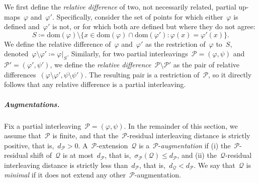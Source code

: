 \documentclass[a4paper,UKenglish, autoref, thm-restate, cleveref]{lipics-v2021}
\newcommand{\dom}{\mathrm{dom}}
\newcommand{\shift}[1]{\sigma_{#1}}
\newcommand{\resdist}[1]{d_{#1}}
\renewcommand{\phi}{\varphi}
\renewcommand{\P}{\mathcal{P}}
\newcommand{\Q}{\mathcal{Q}}
\renewcommand{\mid}{:}
\begin{document}
We first define the \emph{relative difference} of two, not necessarily related, partial up-maps~$\phi$ and~$\phi'$.
Specifically, consider the set of points for which either~$\phi$ is defined and~$\phi'$ is not, or for which both are defined but where they do not agree:
\[
S \coloneqq \dom(\phi) \setminus \{x \in \dom(\phi) \cap \dom(\phi') \mid \phi(x) = \phi'(x)\}. 
\]
We define the relative difference of~$\phi$ and~$\phi'$ as the restriction of~$\phi$ to~$S$, denoted~${\phi \setminus \phi' \coloneqq \phi \vert_{S}}$.
Similarly, for two partial interleavings~$\P = (\phi, \psi)$ and~$\P' = (\phi', \psi')$, we define the \emph{relative difference}~$\P \setminus \P'$ as the pair of relative differences~$(\phi \setminus \phi', \psi \setminus \psi')$.
The resulting pair is a restriction of~$\P$, so it directly follows that any relative difference is a partial interleaving.

\subparagraph{Augmentations.}
Fix a partial interleaving~$\P = (\phi, \psi)$.
In the remainder of this section, we assume that~$\P$ is finite, and that the~$\P$-residual interleaving distance is strictly positive, that is,~$\resdist{\P}> 0$.
A~$\P$-extension~$\Q$ is a~$\P$-\emph{augmentation} if (i) the~$\P$-residual shift of~$\Q$ is at most~$\resdist{\P}$, that is,~$\shift{\P}(\Q) \le \resdist{\P} $, and (ii) the~$\Q$-residual interleaving distance is strictly less than~$\resdist{\P}$, that is,~$\resdist{\Q} < \resdist{\P}$.
We say that~$\Q$ is \emph{minimal} if it does not extend any other~$\P$-augmentation.
\end{document}
